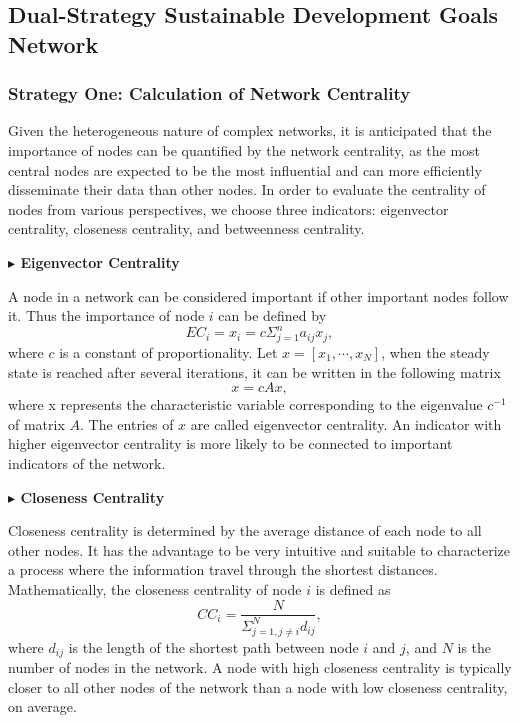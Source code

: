 \documentclass[12pt]{article}  %
\begin{document}
\subsection{Dual-Strategy Sustainable Development Goals Network}
\subsubsection{Strategy One: Calculation of Network Centrality}

Given the heterogeneous nature of complex networks, it is anticipated that the importance of nodes can be quantified by the network centrality, as the most central nodes are expected to be the most influential and can more efficiently disseminate their data than other nodes.
In order to evaluate the centrality of nodes from various perspectives, we choose three indicators: eigenvector centrality, closeness centrality, and betweenness centrality.

\vspace{0.7mm}\begin{itshape}
\textbf{$\blacktriangleright$ Eigenvector Centrality}\end{itshape}

A node in a network can be considered important if other important nodes follow it.
Thus the importance of node $i$ can be defined by
\begin{equation}
    EC_i=x_i=c\Sigma_{j=1}^{n}a_{ij}x_j,
\end{equation}where $c$ is a constant of proportionality. Let  $ x=[x_1,\cdots,x_N]$, when the steady state is reached after several iterations, it can be written in the following matrix \begin{equation}
   x=cAx,
\end{equation}where x represents the characteristic variable corresponding to the eigenvalue $c^{-1}$ of matrix $A$. The entries of $x$ are called eigenvector centrality. An indicator with higher eigenvector centrality is more likely to be connected to important indicators of the network.

\vspace{0.7mm}\begin{itshape}
\textbf{$\blacktriangleright$ Closeness Centrality}
\end{itshape}

Closeness centrality is determined by the average distance of each node to all other nodes.  It has the advantage to be very intuitive
and suitable to characterize a process where the information travel through the
shortest distances. Mathematically,
the closeness centrality of node $i$ is defined as
\begin{equation}
    CC_i=\frac{N}{\Sigma_{j=1,j\ne i}^N d_{ij}},
\end{equation}
where $d_{ij}$ is the length of the shortest path between node $i$ and $j$,  and $N$ is the number of nodes in the network.   A node with high closeness centrality is typically closer to all other nodes of the network than a node with low closeness centrality, on average.
\end{document}
